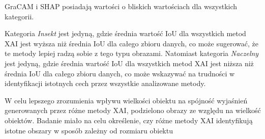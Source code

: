 GraCAM i SHAP posiadają wartości o bliskich wartościach dla wszystkich kategorii.

Kategoria \textit{Insekt} jest jedyną, gdzie średnia wartość IoU dla wszystkich metod XAI jest wyższa niż średnia IoU dla całego zbioru danych, co może sugerować, że te metody lepiej radzą sobie z tego typu obrazami.
Natomiast kategoria \textit{Naczelny} jest jedyną, gdzie średnia wartość IoU dla wszystkich metod XAI jest niższa niż średnia IoU dla całego zbioru danych, co może wskazywać na trudności w identyfikacji istotnych cech przez wszystkie analizowane metody.

\vspace{1cm}
W celu lepszego zrozumienia wpływu wielkości obiektu na spójność wyjaśnień generowanych przez różne metody XAI, podzielono obrazy ze względu na wielkość obiektów.
Badanie miało na celu określenie, czy różne metody XAI identyfikują istotne obszary w sposób zależny od rozmiaru obiektu

